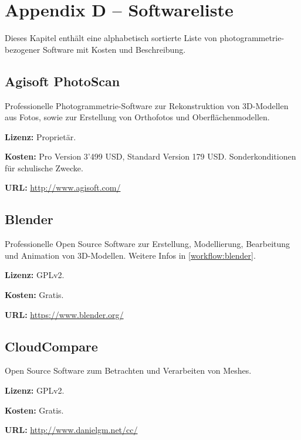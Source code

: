 \chapter{Appendix D -- Softwareliste}

\label{ch:software}

{

\setlength{\parindent}{0em}
\setlength{\parskip}{0.8em}

Dieses Kapitel enthält eine alphabetisch sortierte Liste von
photogrammetrie-bezogener Software mit Kosten und Beschreibung.


\section{Agisoft PhotoScan}

Professionelle Photogrammetrie-Software zur Rekonstruktion von 3D-Modellen aus
Fotos, sowie zur Erstellung von Orthofotos und Oberflächenmodellen.

\textbf{Lizenz:} Proprietär.

\textbf{Kosten:} Pro Version 3'499 USD, Standard Version 179 USD.
Sonderkonditionen für schulische Zwecke.

\textbf{URL:} \url{http://www.agisoft.com/}


\section{Blender}

Professionelle Open Source Software zur Erstellung, Modellierung, Bearbeitung
und Animation von 3D-Modellen. Weitere Infos in \autoref{workflow:blender}.

\textbf{Lizenz:} GPLv2.

\textbf{Kosten:} Gratis.

\textbf{URL:} \url{https://www.blender.org/}


\section{CloudCompare}

Open Source Software zum Betrachten und Verarbeiten von Meshes.

\textbf{Lizenz:} GPLv2.

\textbf{Kosten:} Gratis.

\textbf{URL:} \url{http://www.danielgm.net/cc/}

}
